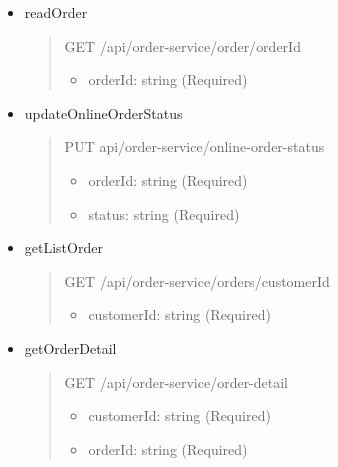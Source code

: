 \begin{itemize}
	\item readOrder
	\begin{quote}
		GET /api/order-service/order/{orderId}
		\begin{itemize}
			\item orderId: string (Required)
		\end{itemize}
	\end{quote}


	\item updateOnlineOrderStatus
	\begin{quote}
		PUT api/order-service/online-order-status
		\begin{itemize}
			\item orderId: string (Required)
			\item status: string (Required)
		\end{itemize}
	\end{quote}

	\item getListOrder
	\begin{quote}
		GET /api/order-service/orders/{customerId}
		\begin{itemize}
			\item customerId: string (Required)
		\end{itemize}
	\end{quote}

	\item getOrderDetail
	\begin{quote}
		GET /api/order-service/order-detail
		\begin{itemize}
			\item customerId: string (Required)
			\item orderId: string (Required)
		\end{itemize}
	\end{quote}
\end{itemize}

